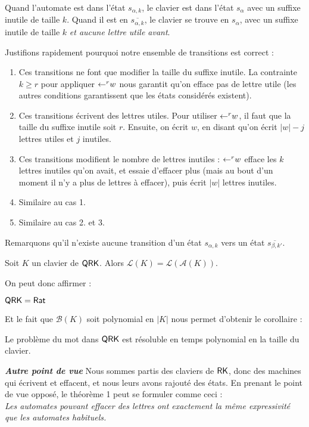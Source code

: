 \documentclass[12pt, a4paper]{article}
\renewcommand{\L}{\mathcal{L}}
\renewcommand{\bar}{\overline}
\newcommand{\A}{\mathcal{A}}
\newcounter{thm}
\begin{document}
    \begin{example}[Intuition]    
    Quand l'automate est dans l'état $s_{\alpha,k}$, le clavier est dans l'état $s_\alpha$ avec un suffixe inutile de taille $k$. Quand il est en $\overline{s_{\alpha,k}}$, le clavier se trouve en $s_\alpha$, avec un suffixe inutile de taille $k$ \emph{et aucune lettre utile avant}. 
    \end{example}
    Justifions rapidement pourquoi notre ensemble de transitions est correct :
    \begin{enumerate}
        \item Ces transitions ne font que modifier la taille du suffixe inutile. La contrainte $k \geqslant r$ pour appliquer $\mathord{\leftarrow}^r w$ nous garantit qu'on efface pas de lettre utile (les autres conditions garantissent que les états considérés existent).
        \item Ces transitions écrivent des lettres utiles. Pour utiliser $\mathord{\leftarrow}^r w$, il faut que la taille du suffixe inutile soit $r$. Ensuite, on écrit $w$, en disant qu'on écrit $|w|-j$ lettres utiles et $j$ inutiles.
        \item Ces transitions modifient le nombre de lettres inutiles : $\mathord{\leftarrow}^r w$ efface les $k$ lettres inutiles qu'on avait, et essaie d'effacer plus (mais au bout d'un moment il n'y a plus de lettres à effacer), puis écrit $|w|$ lettres inutiles.
        \item Similaire au cas 1.
        \item Similaire au cas 2. et 3.
    \end{enumerate}
    Remarquons qu'il n'existe aucune transition d'un état $s_{\alpha, k}$ vers un état $\bar{s_{\beta, k'}}$.

    \begin{bisimautomclav}\label{lklak}
        Soit $K$ un clavier de $\mathsf{QRK}$. Alors $\L(K) = \L(\A(K))$.
    \end{bisimautomclav}
    On peut donc affirmer :
    \begin{QRKegalRat}
        $\mathsf{QRK} = \mathsf{Rat}$
    \end{QRKegalRat}
    Et le fait que $\mathcal{B}(K)$ soit polynomial en $|K|$ nous permet d'obtenir le corollaire :
    \begin{motQRK}\label{th1}
        Le problème du mot dans $\mathsf{QRK}$ est résoluble en temps polynomial en la taille du clavier.
    \end{motQRK} 
    \newpage
    \begin{thmbox}[L]{\textbf{\emph{Autre point de vue}}}
        Nous sommes partis des claviers de $\mathsf{RK}$, donc des machines qui écrivent et effacent, et nous leurs avons rajouté des états.
        En prenant le point de vue opposé, le théorème 1 peut se formuler comme ceci : \\
        \emph{Les automates pouvant effacer des lettres ont exactement la même expressivité que les automates habituels.}
    \end{thmbox}
    \newpage
\end{document}
